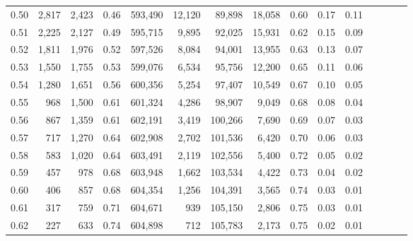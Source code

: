 \begin{tabular}{rrrcrrrrrrrrrrr}
0.50 &   2,817 &  2,423 &                                       0.46 &  593,490 &   12,120 &   89,898 &   18,058 &  0.60 &  0.17 &                         0.11 \\
0.51 &   2,225 &  2,127 &                                       0.49 &  595,715 &    9,895 &   92,025 &   15,931 &  0.62 &  0.15 &                         0.09 \\
0.52 &   1,811 &  1,976 &                                       0.52 &  597,526 &    8,084 &   94,001 &   13,955 &  0.63 &  0.13 &                         0.07 \\
0.53 &   1,550 &  1,755 &                                       0.53 &  599,076 &    6,534 &   95,756 &   12,200 &  0.65 &  0.11 &                         0.06 \\
0.54 &   1,280 &  1,651 &                                       0.56 &  600,356 &    5,254 &   97,407 &   10,549 &  0.67 &  0.10 &                         0.05 \\
0.55 &     968 &  1,500 &                                       0.61 &  601,324 &    4,286 &   98,907 &    9,049 &  0.68 &  0.08 &                         0.04 \\
0.56 &     867 &  1,359 &                                       0.61 &  602,191 &    3,419 &  100,266 &    7,690 &  0.69 &  0.07 &                         0.03 \\
0.57 &     717 &  1,270 &                                       0.64 &  602,908 &    2,702 &  101,536 &    6,420 &  0.70 &  0.06 &                         0.03 \\
0.58 &     583 &  1,020 &                                       0.64 &  603,491 &    2,119 &  102,556 &    5,400 &  0.72 &  0.05 &                         0.02 \\
0.59 &     457 &    978 &                                       0.68 &  603,948 &    1,662 &  103,534 &    4,422 &  0.73 &  0.04 &                         0.02 \\
0.60 &     406 &    857 &                                       0.68 &  604,354 &    1,256 &  104,391 &    3,565 &  0.74 &  0.03 &                         0.01 \\
0.61 &     317 &    759 &                                       0.71 &  604,671 &      939 &  105,150 &    2,806 &  0.75 &  0.03 &                         0.01 \\
0.62 &     227 &    633 &                                       0.74 &  604,898 &      712 &  105,783 &    2,173 &  0.75 &  0.02 &                         0.01 \\

\end{tabular}
